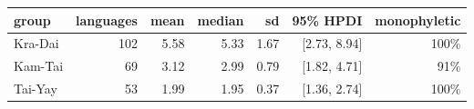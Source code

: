 
\begin{tabular}[t]{lrrrrrr}
\toprule
group & languages & mean & median & sd & 95\% HPDI & monophyletic\\
\midrule
Kra-Dai & 102 & 5.58 & 5.33 & 1.67 & {}[2.73, 8.94] & 100\%\\
Kam-Tai & 69 & 3.12 & 2.99 & 0.79 & {}[1.82, 4.71] & 91\%\\
Tai-Yay & 53 & 1.99 & 1.95 & 0.37 & {}[1.36, 2.74] & 100\%\\
\bottomrule
\end{tabular}
